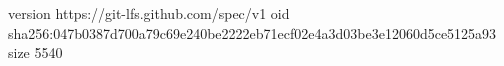 version https://git-lfs.github.com/spec/v1
oid sha256:047b0387d700a79c69e240be2222eb71ecf02e4a3d03be3e12060d5ce5125a93
size 5540
